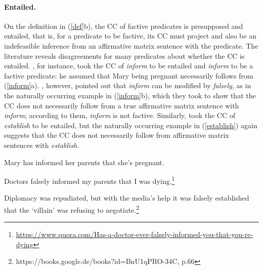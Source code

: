 \documentclass[11pt,fleqn]{article}
\newcommand{\6}{\mbox{$[\hspace*{-.6mm}[$}}
\newcommand{\9}{\mbox{$]\hspace*{-.6mm}]$}}
\begin{document}
\paragraph{Entailed.} On the definition in (\ref{def}b), the CC of factive predicates is presupposed and entailed, that is, for a predicate to be factive, its CC must project and also be an indefeasible inference from an affirmative matrix sentence with the predicate. The literature reveals disagreements for many predicates about whether the CC is entailed. \citet[139]{schlenker10}, for instance, took the CC of {\em inform} to be entailed and {\em inform} to be a factive predicate: he assumed that Mary being pregnant necessarily follows from (\ref{inform}a). \citet[76]{anand-hacquard2014}, however, pointed out that {\em inform} can be modified by {\em falsely}, as in the naturally occurring example in (\ref{inform}b), which they took to show that the CC does not necessarily follow from a true affirmative matrix sentence with {\em inform}; according to them, {\em inform} is not factive. Similarly, \citet{swanson2012} took the CC of {\em establish} to be entailed, but the naturally occurring example in (\ref{establish}) again suggests that the CC does not necessarily follow from affirmative matrix sentences with {\em establish}.

\begin{exe}
\ex\label{inform} 

\begin{xlist}

\ex Mary has informed her parents that she's pregnant.

\ex Doctors falsely informed my parents that I was dying.\footnote{\url{https://www.quora.com/Has-a-doctor-ever-falsely-informed-you-that-you-re-dying}}

\end{xlist}

\ex\label{establish} Diplomacy was repudiated, but with the media's help it was falsely established that the `villain' was refusing to negotiate.\footnote{https://books.google.de/books?id=BnU1qPRO-34C, p.66}
\end{exe}



\end{document}
